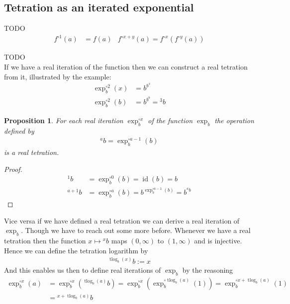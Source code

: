 \documentclass[12pt]{article}
\newtheorem{proposition}{Proposition}
\theoremstyle{definition}
\newcommand{\tet}[2]{{{}^{#2}{#1}}}
\newcommand{\tlog}[2]{\tlogs_{#1}(#2)}
\DeclareMathOperator{\tlogs}{tlog}
\DeclareMathOperator{\id}{id}
\begin{document}
\subsection{Tetration as an iterated exponential}
TODO
\begin{align}
  f^{\circ 1}(a)&=f(a) & f^{\circ x+y}(a)=f^{\circ x}(f^{\circ
  y}(a))\label{iteration}
\end{align}



TODO\\

If we have a real iteration of the function then we can construct a real tetration from it, illustrated by
the example:
\begin{align*}
  \exp_b^{\circ 2}(x)&=b^{b^x}\\
  \exp_b^{\circ 2}(b)&=b^{b^b}=\tet{b}{3}
\end{align*}
\begin{proposition}
  For each real iteration $\exp_b^{\circ x}$ of the function $\exp_b$
  the operation defined by
  \begin{align}
    \tet{b}{a} = \exp_b^{\circ a-1}(b)\label{tet from it}
  \end{align}
  is a real tetration.
\end{proposition}
\begin{proof}
  \begin{align*}
    \tet{b}{1}&=\exp_b^{\circ 0}(b)=\id(b)=b\\
    \tet{b}{a+1}&=\exp_b^{\circ a}(b)=b^{\exp_b^{\circ
    a-1}(b)}=b^{\tet{b}{a}}
  \end{align*}
\end{proof}
Vice versa if we have defined a real tetration we can derive a
real iteration of $\exp_b$. Though we have to reach out
some more before.
Whenever we have a real tetration 
then the function $x\mapsto \tet{b}{x}$ maps $(0,\infty)$ to
$(1,\infty)$ and is injective. Hence we can define the tetration
logarithm by
\begin{align}
  \tet{b}{\tlog{b}{x}}:=x\label{tetration logarithm}
\end{align}
And this enables us then to define real iterations of
$\exp_b$ by the reasoning
\begin{align*}
  \exp_b^{\circ x}(a)&=\exp_b^{\circ x}(\tet{b}{\tlog{b}{a}})
  =\exp_b^{\circ x}(\exp_b^{\circ \tlog{b}{a}}(1))
  =\exp_b^{\circ x+ \tlog{b}{a}}(1)\\
  &=\tet{b}{x+ \tlog{b}{a}}
\end{align*}
\end{document}
